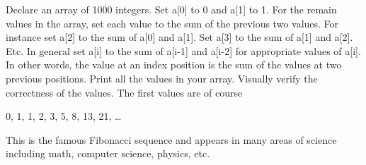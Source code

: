 Declare an array of 1000 integers. Set a[0] to 0 and a[1] to 1. For the remain values in the array, set each value to the sum of the previous two values. For instance set a[2] to the sum of a[0] and a[1]. Set a[3] to the sum of a[1] and a[2]. Etc. In general set a[i] to the sum of a[i-1] and a[i-2] for appropriate values of a[i]. In other words, the value at an index position is the sum of the values at two previous positions. Print all the values in your array. Visually verify the correctness of the values. The first values are of course

\begin{center}



0, 1, 1, 2, 3, 5, 8, 13, 21, \ldots



\end{center}



This is the famous Fibonacci sequence and appears in many areas of science including math, computer science, physics, etc.

